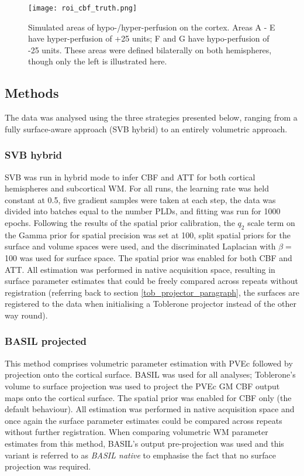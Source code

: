 \begin{figure}[H]
\centering
\texttt{[image: roi\_cbf\_truth.png]}
\caption{Simulated areas of hypo-/hyper-perfusion on the cortex. Areas A - E have hyper-perfusion of +25 units; F and G have hypo-perfusion of -25 units. These areas were defined bilaterally on both hemispheres, though only the left is illustrated here.}
\label{roi_cbf_truth} 
\end{figure}


\subsection{Methods}

The data was analysed using the three strategies presented below, ranging from a fully surface-aware approach (SVB hybrid) to an entirely volumetric approach. 

\subsubsection{SVB hybrid}

SVB was run in hybrid mode to infer CBF and ATT for both cortical hemispheres and subcortical WM. For all runs, the learning rate was held constant at 0.5, five gradient samples were taken at each step, the data was divided into batches equal to the number PLDs, and fitting was run for 1000 epochs. Following the results of the spatial prior calibration, the $q_2$ scale term on the Gamma prior for spatial precision was set at 100, split spatial priors for the surface and volume spaces were used, and the discriminated Laplacian with $\beta =$ 100 was used for surface space. The spatial prior was enabled for both CBF and ATT. All estimation was performed in native acquisition space, resulting in surface parameter estimates that could be freely compared across repeats without registration (referring back to section \ref{tob_projector_paragraph}, the surfaces are registered to the data when initialising a Toblerone projector instead of the other way round). 

\subsubsection{BASIL projected}

This method comprises volumetric parameter estimation with PVEc followed by projection onto the cortical surface. BASIL was used for all analyses; Toblerone's volume to surface projection was used to project the PVEc GM CBF output maps onto the cortical surface. The spatial prior was enabled for CBF only (the default behaviour). All estimation was performed in native acquisition space and once again the surface parameter estimates could be compared across repeats without further registration. When comparing volumetric WM parameter estimates from this method, BASIL's output pre-projection was used and this variant is referred to as \textit{BASIL native} to emphasise the fact that no surface projection was required. 

